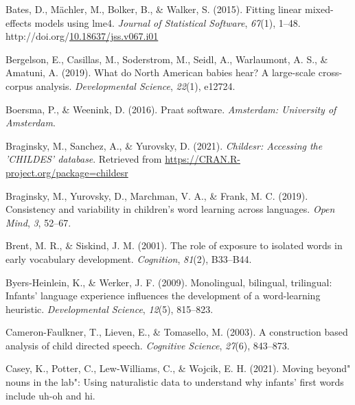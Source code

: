 \documentclass[10pt, letterpaper]{article}
\newenvironment{CSLReferences}%
  {}%
  {\par}
\begin{document}
\setlength{\parindent}{-0.1in} 
\setlength{\leftskip}{0.125in}

\noindent

\hypertarget{refs}{}
\begin{CSLReferences}{1}{0}
\leavevmode\hypertarget{ref-bates2015fitting}{}%
Bates, D., Mächler, M., Bolker, B., \& Walker, S. (2015). Fitting linear
mixed-effects models using {lme4}. \emph{Journal of Statistical
Software}, \emph{67}(1), 1--48.
http://doi.org/\href{https://doi.org/10.18637/jss.v067.i01}{10.18637/jss.v067.i01}

\leavevmode\hypertarget{ref-bergelson2019north}{}%
Bergelson, E., Casillas, M., Soderstrom, M., Seidl, A., Warlaumont, A.
S., \& Amatuni, A. (2019). What do {North American} babies hear? A
large-scale cross-corpus analysis. \emph{Developmental Science},
\emph{22}(1), e12724.

\leavevmode\hypertarget{ref-boersma2016praat}{}%
Boersma, P., \& Weenink, D. (2016). Praat software. \emph{Amsterdam:
University of Amsterdam}.

\leavevmode\hypertarget{ref-braginsky2021childesr}{}%
Braginsky, M., Sanchez, A., \& Yurovsky, D. (2021). \emph{Childesr:
Accessing the 'CHILDES' database}. Retrieved from
\url{https://CRAN.R-project.org/package=childesr}

\leavevmode\hypertarget{ref-braginsky2019consistency}{}%
Braginsky, M., Yurovsky, D., Marchman, V. A., \& Frank, M. C. (2019).
Consistency and variability in children's word learning across
languages. \emph{Open Mind}, \emph{3}, 52--67.

\leavevmode\hypertarget{ref-brent2001role}{}%
Brent, M. R., \& Siskind, J. M. (2001). The role of exposure to isolated
words in early vocabulary development. \emph{Cognition}, \emph{81}(2),
B33--B44.

\leavevmode\hypertarget{ref-byers2009monolingual}{}%
Byers-Heinlein, K., \& Werker, J. F. (2009). Monolingual, bilingual,
trilingual: Infants' language experience influences the development of a
word-learning heuristic. \emph{Developmental Science}, \emph{12}(5),
815--823.

\leavevmode\hypertarget{ref-cameron2003construction}{}%
Cameron-Faulkner, T., Lieven, E., \& Tomasello, M. (2003). A
construction based analysis of child directed speech. \emph{Cognitive
Science}, \emph{27}(6), 843--873.

\leavevmode\hypertarget{ref-caseyURmoving}{}%
Casey, K., Potter, C., Lew-Williams, C., \& Wojcik, E. H. (2021). Moving
beyond" nouns in the lab": Using naturalistic data to understand why
infants' first words include uh-oh and hi.


\end{CSLReferences}
\end{document}
